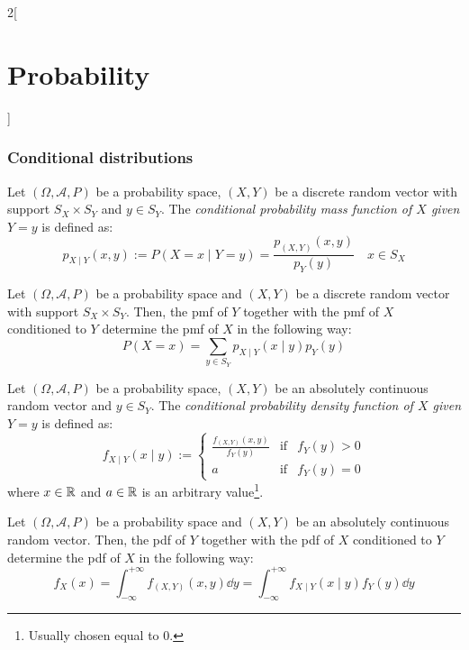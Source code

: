 \documentclass[../../../main.tex]{subfiles}
\begin{document}
\begin{multicols}{2}[\section{Probability}]
  \subsubsection{Conditional distributions}
  \begin{definition}
    Let $(\Omega,\mathcal{A},P)$ be a probability space, $(X,Y)$ be a discrete random vector with support $S_X\times S_Y$ and $y\in S_Y$. The \textit{conditional probability mass function of $X$ given $Y=y$} is defined as: $$p_{X\mid Y}(x,y):=P(X=x\mid Y=y)=\frac{p_{(X,Y)}(x,y)}{p_Y(y)}\quad x\in S_X$$
  \end{definition}
  \begin{prop}
    Let $(\Omega,\mathcal{A},P)$ be a probability space and $(X,Y)$ be a discrete random vector with support $S_X\times S_Y$. Then, the pmf of $Y$ together with the pmf of $X$ conditioned to $Y$ determine the pmf of $X$ in the following way: $$P(X=x)=\sum_{y\in S_Y}p_{X\mid Y}(x\mid y)p_Y(y)$$
  \end{prop}
  \begin{definition}
    Let $(\Omega,\mathcal{A},P)$ be a probability space, $(X,Y)$ be an absolutely continuous random vector and $y\in S_Y$. The \textit{conditional probability density function of $X$ given $Y=y$} is defined as: $$f_{X\mid Y}(x\mid y):=\left\{
      \begin{array}{ccc}
        \frac{f_{(X,Y)}(x,y)}{f_Y(y)} & \text{if} & f_Y(y)>0 \\
        a                             & \text{if} & f_Y(y)=0
      \end{array}\right.
    $$ where $x\in\mathbb{R}$ and $a\in\mathbb{R}$ is an arbitrary value\footnote{Usually chosen equal to 0.}.
  \end{definition}
  \begin{prop}
    Let $(\Omega,\mathcal{A},P)$ be a probability space and $(X,Y)$ be an absolutely continuous random vector. Then, the pdf of $Y$ together with the pdf of $X$ conditioned to $Y$ determine the pdf of $X$ in the following way: $$f_X(x)=\int_{-\infty}^{+\infty}f_{(X,Y)}(x,y)\dd y=\int_{-\infty}^{+\infty}f_{X\mid Y}(x\mid y)f_Y(y)\dd y$$
  \end{prop}
\end{multicols}
\end{document}
